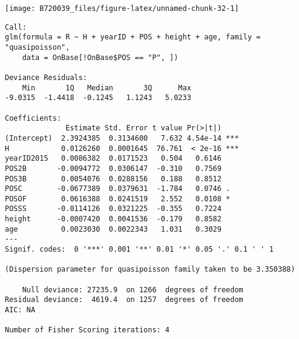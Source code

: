\documentclass[
]{article}
\newenvironment{Shaded}{\begin{snugshade}}{\end{snugshade}}
\newcommand{\AttributeTok}[1]{\textcolor[rgb]{0.77,0.63,0.00}{#1}}
\newcommand{\CommentTok}[1]{\textcolor[rgb]{0.56,0.35,0.01}{\textit{#1}}}
\newcommand{\DecValTok}[1]{\textcolor[rgb]{0.00,0.00,0.81}{#1}}
\newcommand{\FloatTok}[1]{\textcolor[rgb]{0.00,0.00,0.81}{#1}}
\newcommand{\FunctionTok}[1]{\textcolor[rgb]{0.00,0.00,0.00}{#1}}
\newcommand{\NormalTok}[1]{#1}
\newcommand{\OtherTok}[1]{\textcolor[rgb]{0.56,0.35,0.01}{#1}}
\newcommand{\SpecialCharTok}[1]{\textcolor[rgb]{0.00,0.00,0.00}{#1}}
\newcommand{\StringTok}[1]{\textcolor[rgb]{0.31,0.60,0.02}{#1}}
\begin{document}
\begin{Shaded}
\end{Shaded}

\begin{center}\texttt{[image: B720039\_files/figure-latex/unnamed-chunk-32-1]} \end{center}

\begin{verbatim}
Call:
glm(formula = R ~ H + yearID + POS + height + age, family = "quasipoisson", 
    data = OnBase[!OnBase$POS == "P", ])

Deviance Residuals: 
    Min       1Q   Median       3Q      Max  
-9.0315  -1.4418  -0.1245   1.1243   5.0233  

Coefficients:
              Estimate Std. Error t value Pr(>|t|)    
(Intercept)  2.3924385  0.3134600   7.632 4.54e-14 ***
H            0.0126260  0.0001645  76.761  < 2e-16 ***
yearID2015   0.0086382  0.0171523   0.504   0.6146    
POS2B       -0.0094772  0.0306147  -0.310   0.7569    
POS3B        0.0054076  0.0288156   0.188   0.8512    
POSC        -0.0677389  0.0379631  -1.784   0.0746 .  
POSOF        0.0616388  0.0241519   2.552   0.0108 *  
POSSS       -0.0114126  0.0321225  -0.355   0.7224    
height      -0.0007420  0.0041536  -0.179   0.8582    
age          0.0023030  0.0022343   1.031   0.3029    
---
Signif. codes:  0 '***' 0.001 '**' 0.01 '*' 0.05 '.' 0.1 ' ' 1

(Dispersion parameter for quasipoisson family taken to be 3.350388)

    Null deviance: 27235.9  on 1266  degrees of freedom
Residual deviance:  4619.4  on 1257  degrees of freedom
AIC: NA

Number of Fisher Scoring iterations: 4
\end{verbatim}
\end{document}
